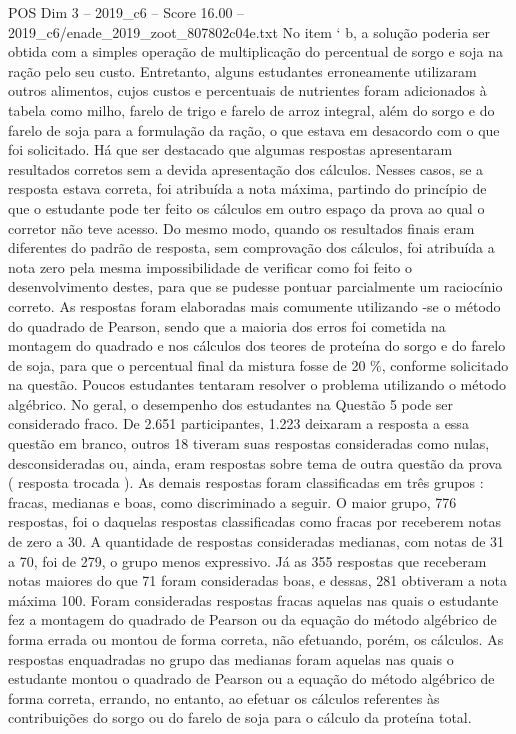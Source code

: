 \begin{textsample}{POS Dim 3 – 2019\_c6 – Score 16.00 – 2019\_c6/enade\_2019\_zoot\_807802c04e.txt}
No item ‘ b, a solução poderia ser obtida com a simples operação de multiplicação do percentual de sorgo e soja na ração pelo seu custo.
Entretanto, alguns estudantes erroneamente utilizaram outros alimentos, cujos custos e percentuais de nutrientes foram adicionados à tabela como milho, farelo de trigo e farelo de arroz integral, além do sorgo e do farelo de soja para a formulação da ração, o que estava em desacordo com o que foi solicitado.
Há que ser destacado que algumas respostas apresentaram resultados corretos sem a devida apresentação dos cálculos.
Nesses casos, se a resposta estava correta, foi atribuída a nota máxima, partindo do princípio de que o estudante pode ter feito os cálculos em outro espaço da prova ao qual o corretor não teve acesso.
Do mesmo modo, quando os resultados finais eram diferentes do padrão de resposta, sem comprovação dos cálculos, foi atribuída a nota zero pela mesma impossibilidade de verificar como foi feito o desenvolvimento destes, para que se pudesse pontuar parcialmente um raciocínio correto.
As respostas foram elaboradas mais comumente utilizando -se o método do quadrado de Pearson, sendo que a maioria dos erros foi cometida na montagem do quadrado e nos cálculos dos teores de proteína do sorgo e do farelo de soja, para que o percentual final da mistura fosse de 20 \%, conforme solicitado na questão.
Poucos estudantes tentaram resolver o problema utilizando o método algébrico.
No geral, o desempenho dos estudantes na Questão 5 pode ser considerado fraco.
De 2.651 participantes, 1.223 deixaram a resposta a essa questão em branco, outros 18 tiveram suas respostas consideradas como nulas, desconsideradas ou, ainda, eram respostas sobre tema de outra questão da prova ( resposta trocada ).
As demais respostas foram classificadas em três grupos : fracas, medianas e boas, como discriminado a seguir.
O maior grupo, 776 respostas, foi o daquelas respostas classificadas como fracas por receberem notas de zero a 30.
A quantidade de respostas consideradas medianas, com notas de 31 a 70, foi de 279, o grupo menos expressivo.
Já as 355 respostas que receberam notas maiores do que 71 foram consideradas boas, e dessas, 281 obtiveram a nota máxima 100.
Foram consideradas respostas fracas aquelas nas quais o estudante fez a montagem do quadrado de Pearson ou da equação do método algébrico de forma errada ou montou de forma correta, não efetuando, porém, os cálculos.
As respostas enquadradas no grupo das medianas foram aquelas nas quais o estudante montou o quadrado de Pearson ou a equação do método algébrico de forma correta, errando, no entanto, ao efetuar os cálculos referentes às contribuições do sorgo ou do farelo de soja para o cálculo da proteína total.

\end{textsample}
